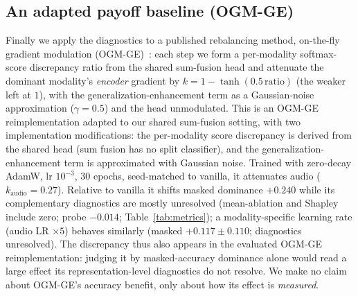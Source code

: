 \documentclass[conference]{IEEEtran}
\begin{document}
\subsection{An adapted payoff baseline (OGM-GE)}
Finally we apply the diagnostics to a published rebalancing method, on-the-fly gradient modulation (OGM-GE)~\cite{peng2022balanced}: each step we form a per-modality softmax-score discrepancy ratio from the shared sum-fusion head and attenuate the dominant modality's \emph{encoder} gradient by $k{=}1-\tanh(0.5\,\mathrm{ratio})$ (the weaker left at $1$), with the generalization-enhancement term as a Gaussian-noise approximation ($\gamma{=}0.5$) and the head unmodulated. This is an OGM-GE reimplementation adapted to our shared sum-fusion setting, with two implementation modifications: the per-modality score discrepancy is derived from the shared head (sum fusion has no split classifier), and the generalization-enhancement term is approximated with Gaussian noise. Trained with zero-decay AdamW, lr $10^{-3}$, $30$ epochs, seed-matched to vanilla, it attenuates audio ($k_{\text{audio}}{=}0.27$). Relative to vanilla it shifts masked dominance $+0.240$ while its complementary diagnostics are mostly unresolved (mean-ablation and Shapley include zero; probe $-0.014$; Table~\ref{tab:metrics}); a modality-specific learning rate (audio LR $\times5$) behaves similarly (masked $+0.117\!\pm\!0.110$; diagnostics unresolved). The discrepancy thus also appears in the evaluated OGM-GE reimplementation: judging it by masked-accuracy dominance alone would read a large effect its representation-level diagnostics do not resolve. We make no claim about OGM-GE's accuracy benefit, only about how its effect is \emph{measured}.
\end{document}
